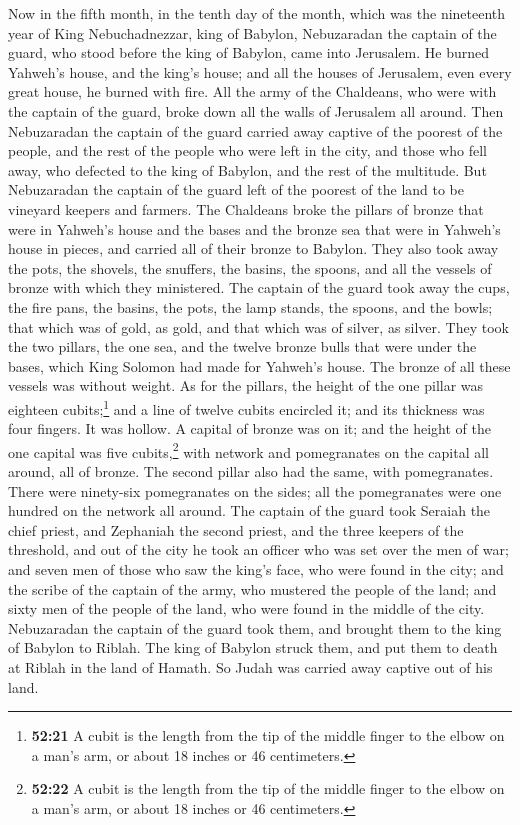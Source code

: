  Now in the fifth month, in the tenth day of the month,
which was the nineteenth year of King Nebuchadnezzar, king of Babylon,
Nebuzaradan the captain of the guard, who stood before the king of
Babylon, came into Jerusalem.  He burned Yahweh's house,
and the king's house; and all the houses of Jerusalem, even every great
house, he burned with fire.  All the army of the
Chaldeans, who were with the captain of the guard, broke down all the
walls of Jerusalem all around.  Then Nebuzaradan the
captain of the guard carried away captive of the poorest of the people,
and the rest of the people who were left in the city, and those who fell
away, who defected to the king of Babylon, and the rest of the
multitude.  But Nebuzaradan the captain of the guard left
of the poorest of the land to be vineyard keepers and farmers.
 The Chaldeans broke the pillars of bronze that were in
Yahweh's house and the bases and the bronze sea that were in Yahweh's
house in pieces, and carried all of their bronze to Babylon.
 They also took away the pots, the shovels, the snuffers,
the basins, the spoons, and all the vessels of bronze with which they
ministered.  The captain of the guard took away the cups,
the fire pans, the basins, the pots, the lamp stands, the spoons, and
the bowls; that which was of gold, as gold, and that which was of
silver, as silver.  They took the two pillars, the one
sea, and the twelve bronze bulls that were under the bases, which King
Solomon had made for Yahweh's house. The bronze of all these vessels was
without weight.  As for the pillars, the height of the
one pillar was eighteen cubits;\footnote{\textbf{52:21} A cubit is the
  length from the tip of the middle finger to the elbow on a man's arm,
  or about 18 inches or 46 centimeters.} and a line of twelve cubits
encircled it; and its thickness was four fingers. It was hollow.
 A capital of bronze was on it; and the height of the one
capital was five cubits,\footnote{\textbf{52:22} A cubit is the length
  from the tip of the middle finger to the elbow on a man's arm, or
  about 18 inches or 46 centimeters.} with network and pomegranates on
the capital all around, all of bronze. The second pillar also had the
same, with pomegranates.  There were ninety-six
pomegranates on the sides; all the pomegranates were one hundred on the
network all around.  The captain of the guard took
Seraiah the chief priest, and Zephaniah the second priest, and the three
keepers of the threshold,  and out of the city he took an
officer who was set over the men of war; and seven men of those who saw
the king's face, who were found in the city; and the scribe of the
captain of the army, who mustered the people of the land; and sixty men
of the people of the land, who were found in the middle of the city.
 Nebuzaradan the captain of the guard took them, and
brought them to the king of Babylon to Riblah.  The king
of Babylon struck them, and put them to death at Riblah in the land of
Hamath. So Judah was carried away captive out of his land.

